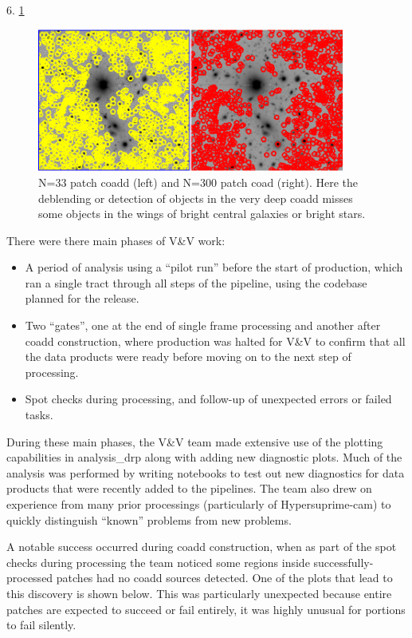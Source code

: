 6. \ref{fig:deblend3}

 \begin{figure}[h]
 \includegraphics[width=0.9\textwidth]{deblend.png}
	 \caption{N=33 patch coadd (left) and N=300 patch coad (right).  Here the deblending or detection of objects in the very deep coadd misses some objects in the wings of bright central galaxies or bright stars.  \label{fig:deblend3}}
 \end{figure}

There were there main phases of V\&V work:

\begin{itemize}
\item A period of analysis using a “pilot run” before the start of production, which ran a single
tract through all steps of the pipeline, using the codebase planned for the release.
\item Two “gates”, one at the end of single frame processing and another after coadd construction,
where production was halted for V\&V to confirm that all the data products were ready before moving
on to the next step of processing.
\item Spot checks during processing, and follow-up of unexpected errors or failed tasks.
\end{itemize}

During these main phases, the V\&V team made extensive use of the plotting capabilities in
analysis\_drp along with adding new diagnostic plots. Much of the analysis was performed by writing
notebooks to test out new diagnostics for data products that were recently added to the pipelines.
The team also drew on experience from many prior processings (particularly of Hypersuprime-cam) to
quickly distinguish ``known'' problems from new problems.

A notable success occurred during coadd construction, when as part of the spot checks during
processing the team noticed some regions inside successfully-processed patches had no coadd sources
detected. One of the plots that lead to this discovery is shown below. This was particularly
unexpected because entire patches are expected to succeed or fail entirely, it was highly unusual
for portions to fail silently.

